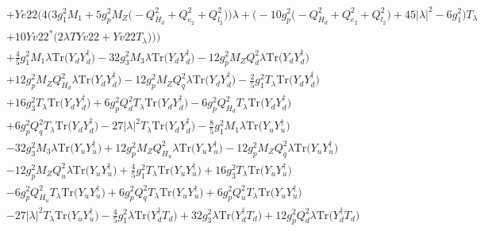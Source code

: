  \begin{align} 
 & +Ye22 \Big(4 \Big(3 g_{1}^{2} M_1  + 5 g_{p}^{2} M_Z \Big(- Q_{H_d}^{2}  + Q_{e_{2}}^{2} + Q_{l_2}^{2}\Big)\Big)\lambda +\Big(-10 g_{p}^{2} \Big(- Q_{H_d}^{2}  + Q_{e_{2}}^{2} + Q_{l_2}^{2}\Big) + 45 |\lambda|^2  -6 g_{1}^{2} \Big)T_{\lambda} \nonumber \\ 
 &+10 Yv22^* \Big(2 \lambda TYv22  + Yv22 T_{\lambda} \Big)\Big)\Big)\nonumber \\ 
 &+\frac{4}{5} g_{1}^{2} M_1 \lambda \mbox{Tr}\Big({Y_d  Y_{d}^{\dagger}}\Big) -32 g_{3}^{2} M_3 \lambda \mbox{Tr}\Big({Y_d  Y_{d}^{\dagger}}\Big) -12 g_{p}^{2} M_Z Q_{d}^{2} \lambda \mbox{Tr}\Big({Y_d  Y_{d}^{\dagger}}\Big) \nonumber \\ 
 &+12 g_{p}^{2} M_Z Q_{H_d}^{2} \lambda \mbox{Tr}\Big({Y_d  Y_{d}^{\dagger}}\Big) -12 g_{p}^{2} M_Z Q_{q}^{2} \lambda \mbox{Tr}\Big({Y_d  Y_{d}^{\dagger}}\Big) -\frac{2}{5} g_{1}^{2} T_{\lambda} \mbox{Tr}\Big({Y_d  Y_{d}^{\dagger}}\Big) \nonumber \\ 
 &+16 g_{3}^{2} T_{\lambda} \mbox{Tr}\Big({Y_d  Y_{d}^{\dagger}}\Big) +6 g_{p}^{2} Q_{d}^{2} T_{\lambda} \mbox{Tr}\Big({Y_d  Y_{d}^{\dagger}}\Big) -6 g_{p}^{2} Q_{H_d}^{2} T_{\lambda} \mbox{Tr}\Big({Y_d  Y_{d}^{\dagger}}\Big) \nonumber \\ 
 &+6 g_{p}^{2} Q_{q}^{2} T_{\lambda} \mbox{Tr}\Big({Y_d  Y_{d}^{\dagger}}\Big) -27 |\lambda|^2 T_{\lambda} \mbox{Tr}\Big({Y_d  Y_{d}^{\dagger}}\Big) -\frac{8}{5} g_{1}^{2} M_1 \lambda \mbox{Tr}\Big({Y_u  Y_{u}^{\dagger}}\Big) \nonumber \\ 
 &-32 g_{3}^{2} M_3 \lambda \mbox{Tr}\Big({Y_u  Y_{u}^{\dagger}}\Big) +12 g_{p}^{2} M_Z Q_{H_u}^{2} \lambda \mbox{Tr}\Big({Y_u  Y_{u}^{\dagger}}\Big) -12 g_{p}^{2} M_Z Q_{q}^{2} \lambda \mbox{Tr}\Big({Y_u  Y_{u}^{\dagger}}\Big) \nonumber \\ 
 &-12 g_{p}^{2} M_Z Q_{u}^{2} \lambda \mbox{Tr}\Big({Y_u  Y_{u}^{\dagger}}\Big) +\frac{4}{5} g_{1}^{2} T_{\lambda} \mbox{Tr}\Big({Y_u  Y_{u}^{\dagger}}\Big) +16 g_{3}^{2} T_{\lambda} \mbox{Tr}\Big({Y_u  Y_{u}^{\dagger}}\Big) \nonumber \\ 
 &-6 g_{p}^{2} Q_{H_u}^{2} T_{\lambda} \mbox{Tr}\Big({Y_u  Y_{u}^{\dagger}}\Big) +6 g_{p}^{2} Q_{q}^{2} T_{\lambda} \mbox{Tr}\Big({Y_u  Y_{u}^{\dagger}}\Big) +6 g_{p}^{2} Q_{u}^{2} T_{\lambda} \mbox{Tr}\Big({Y_u  Y_{u}^{\dagger}}\Big) \nonumber \\ 
 &-27 |\lambda|^2 T_{\lambda} \mbox{Tr}\Big({Y_u  Y_{u}^{\dagger}}\Big) -\frac{4}{5} g_{1}^{2} \lambda \mbox{Tr}\Big({Y_{d}^{\dagger}  T_d}\Big) +32 g_{3}^{2} \lambda \mbox{Tr}\Big({Y_{d}^{\dagger}  T_d}\Big) +12 g_{p}^{2} Q_{d}^{2} \lambda \mbox{Tr}\Big({Y_{d}^{\dagger}  T_d}\Big) \nonumber \\ 

\end{align}

